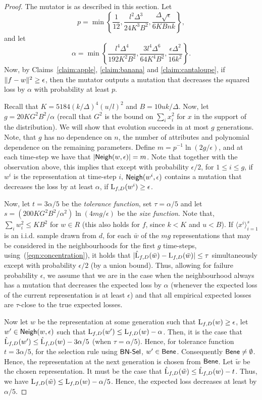 \begin{proof}
The mutator is as described in this section. Let 
\[ p = \min\left\{\frac{1}{12}, \frac{l^2\Delta^3}{24K^3B^2}, \frac{\Delta
\sqrt{\epsilon}}{6KBnk}\right\},\] 
and let 
\[ \alpha = \min\left\{\frac{l^4 \Delta^4}{192 K^2B^2}, \frac{3 l^4
\Delta^6}{64K^4B^2}, \frac{\epsilon\Delta^2}{16k^2}\right\}.\] 
Now, by Claims~\ref{claim:apple}, \ref{claim:banana} and \ref{claim:cantaloupe},
if $\Vert f - w \Vert^2 \geq \epsilon$, then the mutator outputs a mutation that
decreases the squared loss by $\alpha$ with probability at least $p$.

Recall that $K = 5184 (k/\Delta)^4 (u/l)^2$ and $B = 10uk/\Delta$.  Now, let $g
= 20 K G^2 B^2/\alpha$ (recall that $G^2$ is the bound on $\sum_{i} x_i^2$ for
$x$ in the support of the distribution). We will show that evolution succeeds in
at most $g$ generations. Note, that $g$ has no dependence on $n$, the number of
attributes and polynomial dependence on the remaining parameters. Define $m =
p^{-1} \ln(2g /\epsilon)$, and at each time-step we have that $|\mathsf{Neigh}(w,
\epsilon)| = m$.  Note that together with the observation above, this implies
that except with probability $\epsilon/2$, for $1 \leq i \leq g$, if $w^i$ is
the representation at time-step $i$, $\mathsf{Neigh}(w^i, \epsilon)$ contains a mutation
that decreases the loss by at least $\alpha$, if $\mathrm{L}_{f, D}(w^i) \geq
\epsilon$. 

Now, let $t = 3\alpha / 5$ be the \emph{tolerance function}, set $\tau =
\alpha/5$ and let $s = (200 KG^2B^2/\alpha^2) \ln(4mg/\epsilon)$ be the
\emph{size function}. Note that, $\sum_{i} w_i^2 \leq KB^2$ for $w \in R$ (this
also holds for $f$, since $k < K$ and $u < B$). If $\langle x^i \rangle_{i=1}^s$
is an i.i.d. sample drawn from $d$, for each $\bar{w}$ of the $mg$
representations that may be considered in the neighbourhoods for the first $g$
time-steps, using~(\ref{eqn:concentration}), it holds that $|\hat{\mathrm{L}}_{f,
D}(\bar{w}) - \mathrm{L}_{f, D}(\bar{w})| \leq \tau$ simultaneously except with
probability $\epsilon/2$ (by a union bound). Thus, allowing for failure
probability $\epsilon$, we assume that we are in the case when the neighbourhood
always has a mutation that decreases the expected loss by $\alpha$ (whenever the
expected loss of the current representation is at least $\epsilon$) and that all
empirical expected losses are $\tau$-close to the true expected losses.

Now let $w$ be the representation at some generation such that $\mathrm{L}_{f, D}(w)
\geq \epsilon$, let $w^\prime \in \mathsf{Neigh}(w, \epsilon)$ such that $\mathrm{L}_{f,
D}(w^\prime) \leq \mathrm{L}_{f, D}(w) - \alpha$. Then, it is the case that
$\hat{\mathrm{L}}_{f, D}(w^\prime) \leq \hat{\mathrm{L}}_{f, D}(w) - 3\alpha/5$ (when
$\tau = \alpha/5$). Hence, for tolerance function $t = 3 \alpha/5$, for the
selection rule using $\mathsf{BN\mbox{-}Sel}$, $w^\prime \in \mathsf{Bene}$. Consequently $\mathsf{Bene} \neq
\emptyset$. Hence, the representation at the next generation is chosen from
$\mathsf{Bene}$. Let $\tilde{w}$ be the chosen representation. It must be the case that
$\hat{\mathrm{L}}_{f, D}(\tilde{w}) \leq \hat{\mathrm{L}}_{f, D}(w) - t$. Thus, we have
$\mathrm{L}_{f, D}(\tilde{w}) \leq \mathrm{L}_{f, D}(w) - \alpha/5$. Hence, the expected
loss decreases at least by $\alpha/5$.


\end{proof}
